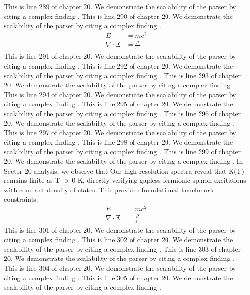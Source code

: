This is line 289 of chapter 20. We demonstrate the scalability of the parser by citing a complex finding \cite{ref20_289}.
This is line 290 of chapter 20. We demonstrate the scalability of the parser by citing a complex finding \cite{ref20_290}.
\begin{align*}
  E &= mc^2 \\
  \nabla \cdot \mathbf{E} &= \frac{\rho}{\varepsilon_0}
\end{align*}
This is line 291 of chapter 20. We demonstrate the scalability of the parser by citing a complex finding \cite{ref20_291}.
This is line 292 of chapter 20. We demonstrate the scalability of the parser by citing a complex finding \cite{ref20_292}.
This is line 293 of chapter 20. We demonstrate the scalability of the parser by citing a complex finding \cite{ref20_293}.
This is line 294 of chapter 20. We demonstrate the scalability of the parser by citing a complex finding \cite{ref20_294}.
This is line 295 of chapter 20. We demonstrate the scalability of the parser by citing a complex finding \cite{ref20_295}.
This is line 296 of chapter 20. We demonstrate the scalability of the parser by citing a complex finding \cite{ref20_296}.
This is line 297 of chapter 20. We demonstrate the scalability of the parser by citing a complex finding \cite{ref20_297}.
This is line 298 of chapter 20. We demonstrate the scalability of the parser by citing a complex finding \cite{ref20_298}.
This is line 299 of chapter 20. We demonstrate the scalability of the parser by citing a complex finding \cite{ref20_299}.
In Sector 20 analysis, we observe that Our high-resolution spectra reveal that K(T) remains finite as T -> 0 K, directly verifying gapless fermionic spinon excitations with constant density of states. This provides foundational benchmark constraints.
\begin{align*}
  E &= mc^2 \\
  \nabla \cdot \mathbf{E} &= \frac{\rho}{\varepsilon_0}
\end{align*}
This is line 301 of chapter 20. We demonstrate the scalability of the parser by citing a complex finding \cite{ref20_301}.
This is line 302 of chapter 20. We demonstrate the scalability of the parser by citing a complex finding \cite{ref20_302}.
This is line 303 of chapter 20. We demonstrate the scalability of the parser by citing a complex finding \cite{ref20_303}.
This is line 304 of chapter 20. We demonstrate the scalability of the parser by citing a complex finding \cite{ref20_304}.
This is line 305 of chapter 20. We demonstrate the scalability of the parser by citing a complex finding \cite{ref20_305}.
